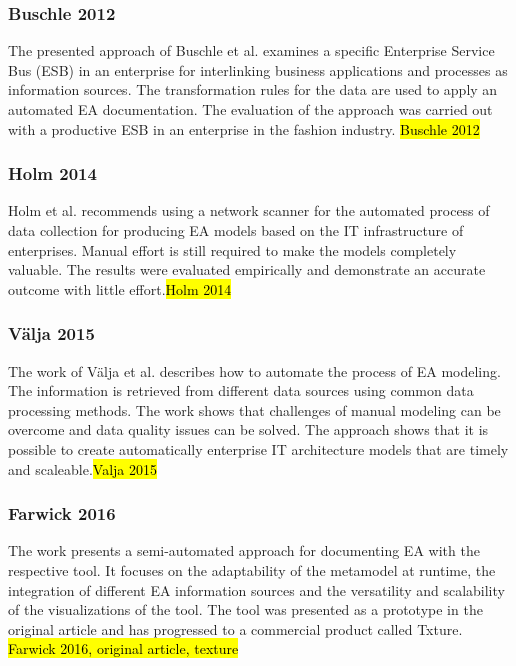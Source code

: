 \subsubsection{Buschle  2012}
The presented approach of Buschle et al. examines a specific Enterprise Service Bus (ESB) in an enterprise for interlinking business applications and processes as information sources. The transformation rules for the data are used to apply an automated EA documentation. The evaluation of the approach was carried out with a productive ESB in an enterprise in the fashion industry. \hl{Buschle 2012}

\subsubsection{Holm  2014}
Holm et al. recommends using a network scanner for the automated process of data collection for producing EA models based on the IT infrastructure of enterprises. Manual effort is still required to make the models completely valuable. The results were evaluated empirically and demonstrate an accurate outcome with little effort.\hl{Holm 2014}

\subsubsection{Välja 2015}
The work of Välja et al. describes how to automate the process of EA modeling. The information is retrieved from different data sources using common data processing methods. The work shows that challenges of manual modeling can be overcome and data quality issues can be solved. The approach shows that it is possible to create automatically enterprise IT architecture models that are timely and scaleable.\hl{Valja 2015}

\subsubsection{Farwick 2016}
The work presents a semi-automated approach for documenting EA with the respective tool. It focuses on the adaptability of the metamodel at runtime, the integration of different EA information sources and the versatility and scalability of the visualizations of the tool. The tool was presented as a prototype in the original article and has progressed to a commercial product called Txture. \hl{Farwick 2016, original article, texture}

